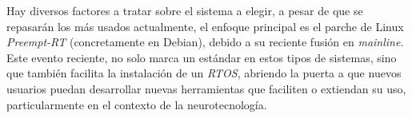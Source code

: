 Hay diversos factores a tratar sobre el sistema a elegir, a pesar de que se repasarán los más usados actualmente, el enfoque principal es el parche de Linux \textit{Preempt-RT} (concretamente en Debian), debido a su reciente fusión en \textit{mainline}. Este evento reciente, no solo marca un estándar en estos tipos de sistemas, sino que también facilita la instalación de un \textit{RTOS}, abriendo la puerta a que nuevos usuarios puedan desarrollar nuevas herramientas que faciliten o extiendan su uso, particularmente en el contexto de la neurotecnología.

